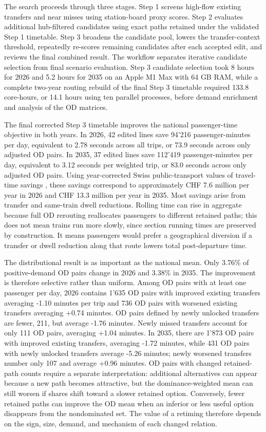 \documentclass[10pt,a4paper]{article}
\begin{document}
The search proceeds through three stages. Step 1 screens high-flow existing transfers and near misses using station-board proxy scores. Step 2 evaluates additional hub-filtered candidates using exact paths retained under the validated Step 1 timetable. Step 3 broadens the candidate pool, lowers the transfer-context threshold, repeatedly re-scores remaining candidates after each accepted edit, and reviews the final combined result. The workflow separates iterative candidate selection from final scenario evaluation. Step 3 candidate selection took 8 hours for 2026 and 5.2 hours for 2035 on an Apple M1 Max with 64 GB RAM, while a complete two-year routing rebuild of the final Step 3 timetable required 133.8 core-hours, or 14.1 hours using ten parallel processes, before demand enrichment and analysis of the OD matrices.

The final corrected Step 3 timetable improves the national passenger-time objective in both years. In 2026, 42 edited lines save 94'216 passenger-minutes per day, equivalent to 2.78 seconds across all trips, or 73.9 seconds across only adjusted OD pairs. In 2035, 37 edited lines save 112'419 passenger-minutes per day, equivalent to 3.12 seconds per weighted trip, or 83.0 seconds across only adjusted OD pairs. Using year-corrected Swiss public-transport values of travel-time savings \citep{axhausenEtAl2004SwissVTTS}, these savings correspond to approximately CHF 7.6 million per year in 2026 and CHF 13.3 million per year in 2035. Most savings arise from transfer and same-train dwell reductions. Rolling time can rise in aggregate because full OD rerouting reallocates passengers to different retained paths; this does not mean trains run more slowly, since section running times are preserved by construction. It means passengers would prefer a geographical diversion if a transfer or dwell reduction along that route lowers total post-departure time.

The distributional result is as important as the national mean. Only 3.76\% of positive-demand OD pairs change in 2026 and 3.38\% in 2035. The improvement is therefore selective rather than uniform. Among OD pairs with at least one passenger per day, 2026 contains 1'635 OD pairs with improved existing transfers averaging -1.10 minutes per trip and 736 OD pairs with worsened existing transfers averaging +0.74 minutes. OD pairs defined by newly unlocked transfers are fewer, 211, but average -1.76 minutes. Newly missed transfers account for only 111 OD pairs, averaging +1.04 minutes. In 2035, there are 1'873 OD pairs with improved existing transfers, averaging -1.72 minutes, while 431 OD pairs with newly unlocked transfers average -5.26 minutes; newly worsened transfers number only 107 and average +0.96 minutes. OD pairs with changed retained-path counts require a separate interpretation: additional alternatives can appear because a new path becomes attractive, but the dominance-weighted mean can still worsen if shares shift toward a slower retained option. Conversely, fewer retained paths can improve the OD mean when an inferior or less useful option disappears from the nondominated set. The value of a retiming therefore depends on the sign, size, demand, and mechanism of each changed relation.
\end{document}
